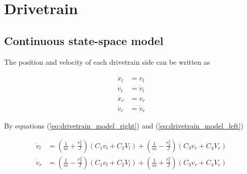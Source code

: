 \section{Drivetrain}

\subsection{Continuous state-space model}

The position and velocity of each drivetrain side can be written as

\begin{align}
  \dot{x}_l &= v_l \label{eq:drivetrain_cont_ss_posl} \\
  \dot{v}_l &= \dot{v}_l \label{eq:drivetrain_cont_ss_vell} \\
  \dot{x}_r &= v_r \label{eq:drivetrain_cont_ss_posr} \\
  \dot{v}_r &= \dot{v}_r \label{eq:drivetrain_cont_ss_velr}
\end{align}

By equations (\ref{eq:drivetrain_model_right}) and
(\ref{eq:drivetrain_model_left})

\begin{align*}
  \dot{v}_l &= \left(\frac{1}{m} + \frac{r_b^2}{J}\right)
    \left(C_1 v_l + C_2 V_l\right) +
    \left(\frac{1}{m} - \frac{r_b^2}{J}\right) \left(C_3 v_r + C_4 V_r\right) \\
  \dot{v}_r &= \left(\frac{1}{m} - \frac{r_b^2}{J}\right)
    \left(C_1 v_l + C_2 V_l\right) +
    \left(\frac{1}{m} + \frac{r_b^2}{J}\right) \left(C_3 v_r + C_4 V_r\right)
\end{align*}

